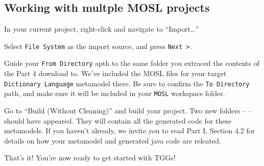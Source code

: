 \newpage
\subsection{Working with multple MOSL projects}
\texHeader
\label{sec:multiMOSL}


In your current project, right-click and navigate to ``Import\ldots''

Select \texttt{File System} as the import source, and press \texttt{Next >}.

Guide your \texttt{From Directory} apth to the same folder you extraced the contents of the Part 4 download to. We've included the MOSL files for your target
\texttt{Dictionary Language} metamodel there. Be sure to confirm the \texttt{To Directory} path, and make sure it will be included in your \texttt{MOSL}
workspace folder.

Go to ``Build (Without Cleaning)'' and build your project. Two new folders -- -- should have appeared. They will contain all the generated code for these
metamodels. If you haven't already, we invite you to read Part I, Section 4.2 for details on how your metamodel and generated java code are releated.

That's it! You're now ready to get started with TGGs!
